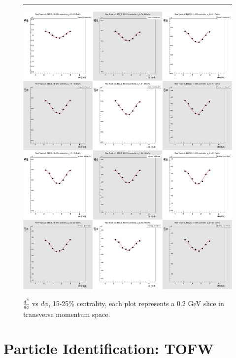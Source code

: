 \begin{figure}[H]
  \centering
  \caption[$\frac{dN}{d\phi}$ vs $d\phi$, 15-25\% centrality.]{$\frac{d^N}{d\phi}$ vs $d\phi$, 15-25\% centrality, each plot represents a 0.2 GeV slice in transverse momentum space.}
  \rule{35em}{0.5pt}
  \includegraphics[width=1\textwidth]{chargedtrackv2/htrkdphi2bbcs_3.jpg}
  \label{fig:Ndphicent3}
\end{figure}

\section{Particle Identification: TOFW}

